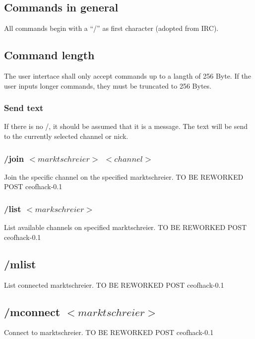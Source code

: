 \documentclass[12pt,a4paper]{book}
\begin{document}
\subsection{Commands in general}
All commands begin with a "`/"' as first character (adopted from IRC).
\subsection{Command length}
The user intertace shall only accept commands up to a langth of 256 Byte.
If the user inputs longer commands, they must be truncated
to 256 Bytes.
\subsubsection{Send text}
If there is no /, it should be assumed that it is a message.
The text will be send to the currently selected channel or nick.

\subsubsection{/join $<marktschreier>$ $<channel>$}
Join the specific channel on the specified marktschreier.
TO BE REWORKED
POST ceofhack-0.1
\subsubsection{/list $<markschreier>$}
List available channels on specified marktschreier.
TO BE REWORKED
POST ceofhack-0.1

\subsection{/mlist}
List connected marktschreier.
TO BE REWORKED
POST ceofhack-0.1

\subsection{/mconnect $<marktschreier>$}
Connect to marktschreier.
TO BE REWORKED
POST ceofhack-0.1

\end{document}
